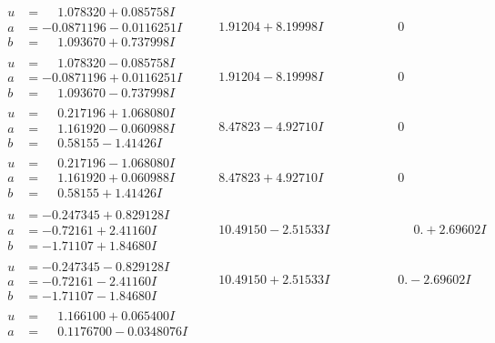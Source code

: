 \documentclass[1p]{elsarticle_modified}
\theoremstyle{definition}
\begin{document}
$$\begin{array}{c|c|c}
\begin{aligned}
u &= \phantom{-}1.078320 + 0.085758 I \\
a &= -0.0871196 - 0.0116251 I \\
b &= \phantom{-}1.093670 + 0.737998 I\end{aligned}
 & \phantom{-}1.91204 + 8.19998 I & \phantom{-0.000000 } 0 \\ \hline\begin{aligned}
u &= \phantom{-}1.078320 - 0.085758 I \\
a &= -0.0871196 + 0.0116251 I \\
b &= \phantom{-}1.093670 - 0.737998 I\end{aligned}
 & \phantom{-}1.91204 - 8.19998 I & \phantom{-0.000000 } 0 \\ \hline\begin{aligned}
u &= \phantom{-}0.217196 + 1.068080 I \\
a &= \phantom{-}1.161920 - 0.060988 I \\
b &= \phantom{-}0.58155 - 1.41426 I\end{aligned}
 & \phantom{-}8.47823 - 4.92710 I & \phantom{-0.000000 } 0 \\ \hline\begin{aligned}
u &= \phantom{-}0.217196 - 1.068080 I \\
a &= \phantom{-}1.161920 + 0.060988 I \\
b &= \phantom{-}0.58155 + 1.41426 I\end{aligned}
 & \phantom{-}8.47823 + 4.92710 I & \phantom{-0.000000 } 0 \\ \hline\begin{aligned}
u &= -0.247345 + 0.829128 I \\
a &= -0.72161 + 2.41160 I \\
b &= -1.71107 + 1.84680 I\end{aligned}
 & \phantom{-}10.49150 - 2.51533 I & \phantom{-0.000000 -}0. + 2.69602 I \\ \hline\begin{aligned}
u &= -0.247345 - 0.829128 I \\
a &= -0.72161 - 2.41160 I \\
b &= -1.71107 - 1.84680 I\end{aligned}
 & \phantom{-}10.49150 + 2.51533 I & \phantom{-0.000000 } 0. - 2.69602 I \\ \hline\begin{aligned}
u &= \phantom{-}1.166100 + 0.065400 I \\
a &= \phantom{-}0.1176700 - 0.0348076 I \\

\end{aligned}
\end{array}$$
\end{document}
